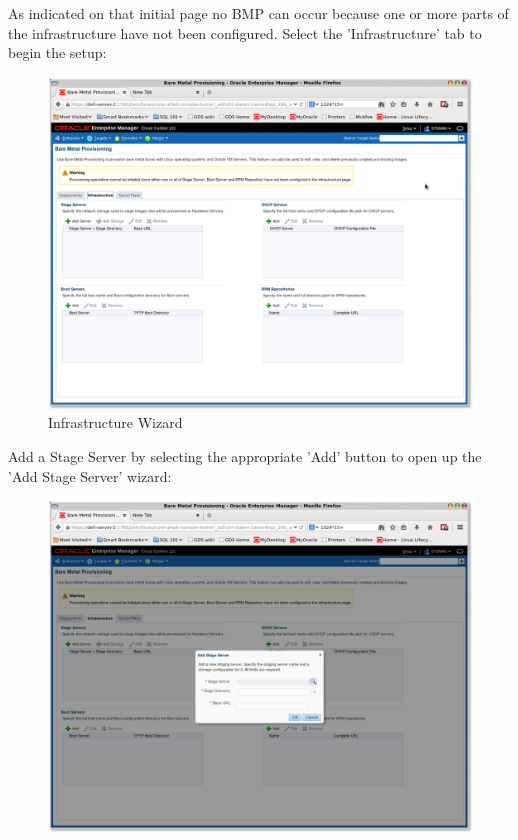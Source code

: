 \documentclass[11pt]{article}
\begin{document}
\clearpage
As indicated on that initial page no BMP can occur because one or more parts of the infrastructure have not been configured. 
Select the 'Infrastructure' tab to begin the setup:
\begin{figure}[htb]
\centering
\includegraphics[width=.9\linewidth]{./images/Infra_1.png}
\caption{Infrastructure Wizard}
\end{figure}
\clearpage

Add a Stage Server by selecting the appropriate 'Add' button to open up the 'Add Stage Server' wizard:
\begin{figure}[htb]
\centering
\includegraphics[width=.9\linewidth]{./images/Server_Add_1.png}
\end{figure}
\clearpage
\end{document}
